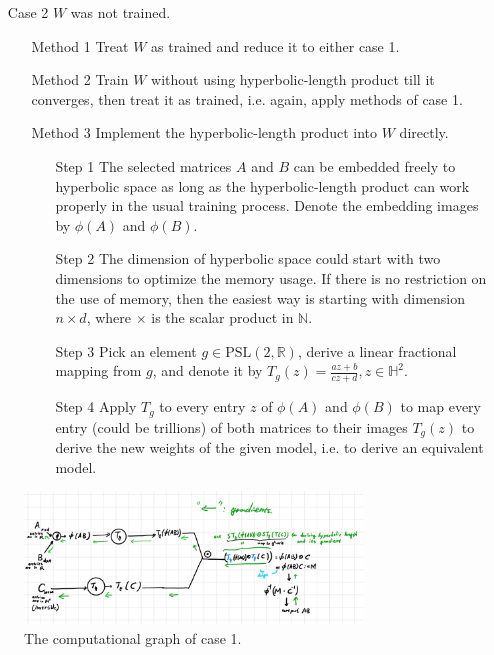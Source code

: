 \documentclass{article}
\theoremstyle{plain}
\theoremstyle{plain} %
\theoremstyle{definition}  %
\theoremstyle{remark}  %
\theoremstyle{plain}
\begin{document}
\begin{itemize}
\item[Case 2] $W$ was not trained.
\begin{itemize}
\item[Method 1] Treat $W$ as trained and reduce it to either case 1.
\item[Method 2] Train $W$ without using hyperbolic-length product till it converges, then treat it as trained, i.e. again, apply methods of case 1.
\item[Method 3] Implement the hyperbolic-length product into $W$ directly.
\begin{itemize}
\item[Step 1] The selected matrices $A$ and $B$ can be embedded freely to hyperbolic space as long as the hyperbolic-length product can work properly in the usual training process. Denote the embedding images by $\phi(A)$ and $\phi(B)$.
\item[Step 2] The dimension of hyperbolic space could start with two dimensions to optimize the memory usage. If there is no restriction on the use of memory, then the easiest way is starting with dimension $n\times d$, where $\times$ is the scalar product in $\mathbb{N}$.
\item[Step 3] Pick an element $g\in\text{PSL}(2,\mathbb{R})$, derive a linear fractional mapping from $g$, and denote it by $T_g(z)=\frac{az+b}{cz+d}, z\in\mathbb{H}^2$. 
\item[Step 4] Apply $T_g$ to every entry $z$ of $\phi(A)$ and $\phi(B)$ to map every entry (could be trillions) of both matrices to their images $T_g(z)$ to derive the new weights of the given model, i.e. to derive an equivalent model.
\end{itemize}
\end{itemize}
\end{itemize}




\begin{figure}[H]
\caption{The computational graph of case 1.}
\centering
\includegraphics[width=0.8\textwidth]{8.png}
\end{figure}
\end{document}
